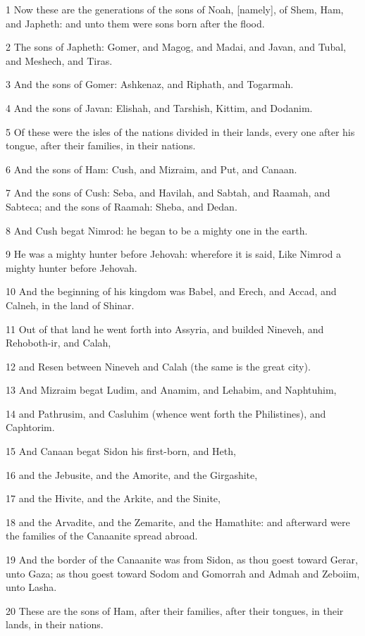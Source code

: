 \par 1 Now these are the generations of the sons of Noah, [namely], of Shem, Ham, and Japheth: and unto them were sons born after the flood.
\par 2 The sons of Japheth: Gomer, and Magog, and Madai, and Javan, and Tubal, and Meshech, and Tiras.
\par 3 And the sons of Gomer: Ashkenaz, and Riphath, and Togarmah.
\par 4 And the sons of Javan: Elishah, and Tarshish, Kittim, and Dodanim.
\par 5 Of these were the isles of the nations divided in their lands, every one after his tongue, after their families, in their nations.
\par 6 And the sons of Ham: Cush, and Mizraim, and Put, and Canaan.
\par 7 And the sons of Cush: Seba, and Havilah, and Sabtah, and Raamah, and Sabteca; and the sons of Raamah: Sheba, and Dedan.
\par 8 And Cush begat Nimrod: he began to be a mighty one in the earth.
\par 9 He was a mighty hunter before Jehovah: wherefore it is said, Like Nimrod a mighty hunter before Jehovah.
\par 10 And the beginning of his kingdom was Babel, and Erech, and Accad, and Calneh, in the land of Shinar.
\par 11 Out of that land he went forth into Assyria, and builded Nineveh, and Rehoboth-ir, and Calah,
\par 12 and Resen between Nineveh and Calah (the same is the great city).
\par 13 And Mizraim begat Ludim, and Anamim, and Lehabim, and Naphtuhim,
\par 14 and Pathrusim, and Casluhim (whence went forth the Philistines), and Caphtorim.
\par 15 And Canaan begat Sidon his first-born, and Heth,
\par 16 and the Jebusite, and the Amorite, and the Girgashite,
\par 17 and the Hivite, and the Arkite, and the Sinite,
\par 18 and the Arvadite, and the Zemarite, and the Hamathite: and afterward were the families of the Canaanite spread abroad.
\par 19 And the border of the Canaanite was from Sidon, as thou goest toward Gerar, unto Gaza; as thou goest toward Sodom and Gomorrah and Admah and Zeboiim, unto Lasha.
\par 20 These are the sons of Ham, after their families, after their tongues, in their lands, in their nations.
